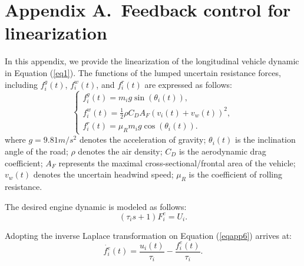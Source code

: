 \documentclass[a4paper]{cas-sc}
\begin{document}
\appendix


\section*{Appendix A.~Feedback control for linearization}
\label{AppendixA}
In this appendix, we provide the linearization of the longitudinal vehicle dynamic in Equation (\ref{eq1}). The functions of the lumped uncertain resistance forces, including $f_i^g(t)$, $f_i^w(t)$, and $f_i^r(t)$ are expressed as follows:
\begin{equation}
  \left\{\begin{array}{l}
    f_{i}^{g}(t)=m_{i} g \sin \left(\theta_{i}(t)\right),                        \\
    f_{i}^{w}(t)=\frac{1}{2} \rho C_{D} A_{F}\left(v_{i}(t)+v_{w}(t)\right)^{2}, \\
    f_{i}^{r}(t)=\mu_{R} m_{i} g \cos \left(\theta_{i}(t)\right).
  \end{array}\right.
  \label{eqapp5}
\end{equation}
where $g=9.81m/s^2$ denotes the acceleration of gravity; $\theta_i(t)$ is the inclination angle of the road; $\rho$ denotes the air density; $C_D$ is the aerodynamic drag coefficient; $A_F$ represents the maximal cross-sectional/frontal area of the vehicle; $v_w(t)$ denotes the uncertain headwind speed; $\mu_R$ is the coefficient of rolling resistance.

The desired engine dynamic is modeled as follows:
\begin{equation}
  (\tau_is+1)F_i^e=U_i.
  \label{eqapp6}
\end{equation}

Adopting the inverse Laplace transformation on Equation (\ref{eqapp6}) arrives at:
\begin{equation}
  \dot{f_i^e}\left(t\right)=\frac{u_i(t)}{\tau_i}-\frac{f_i^e\left(t\right)}{\tau_i}.
  \label{eqapp7}
\end{equation}
\end{document}
